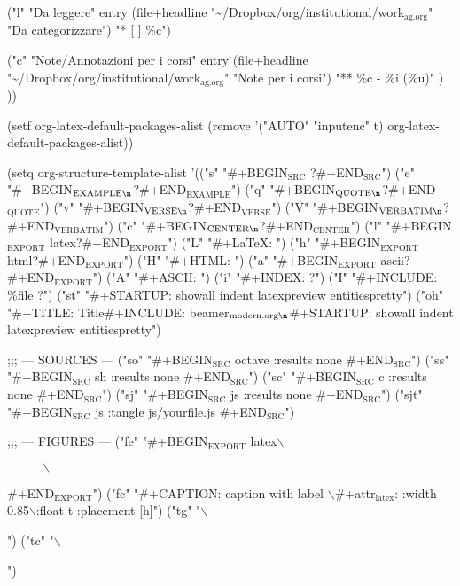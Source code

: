 \documentclass[presentation]{beamer}
\begin{document}
("l" "Da leggere" entry
 (file+headline "\textasciitilde{}/Dropbox/org/institutional/work\(_{\text{ag.org}}\)" "Da categorizzare")
 "\alert{*} [ ] \%c\n")

("c" "Note/Annotazioni per i corsi" entry
 (file+headline "\textasciitilde{}/Dropbox/org/institutional/work\(_{\text{ag.org}}\)" "Note per i corsi")
 "** \%c - \%i (\%u)"
 )
))

(setf org-latex-default-packages-alist
      (remove '("AUTO" "inputenc" t) org-latex-default-packages-alist))

(setq org-structure-template-alist
      '(("s" "\#+BEGIN\(_{\text{SRC}}\) ?\n\n\#+END\(_{\text{SRC}}\)")
        ("e" "\#+BEGIN\(_{\text{EXAMPLE}\n}\)?\n\#+END\(_{\text{EXAMPLE}}\)")
        ("q" "\#+BEGIN\(_{\text{QUOTE}\n}\)?\n\#+END\(_{\text{QUOTE}}\)")
        ("v" "\#+BEGIN\(_{\text{VERSE}\n}\)?\n\#+END\(_{\text{VERSE}}\)")
        ("V" "\#+BEGIN\(_{\text{VERBATIM}\n}\)?\n\#+END\(_{\text{VERBATIM}}\)")
        ("c" "\#+BEGIN\(_{\text{CENTER}\n}\)?\n\#+END\(_{\text{CENTER}}\)")
        ("l" "\#+BEGIN\(_{\text{EXPORT}}\) latex\n?\n\#+END\(_{\text{EXPORT}}\)")
        ("L" "\#+\LaTeX{}: ")
        ("h" "\#+BEGIN\(_{\text{EXPORT}}\) html\n?\n\#+END\(_{\text{EXPORT}}\)")
        ("H" "\#+HTML: ")
        ("a" "\#+BEGIN\(_{\text{EXPORT}}\) ascii\n?\n\#+END\(_{\text{EXPORT}}\)")
        ("A" "\#+ASCII: ")
        ("i" "\#+INDEX: ?")
        ("I" "\#+INCLUDE: \%file ?")
        ("st" "\#+STARTUP: showall indent latexpreview entitiespretty")
        ("oh" "\#+TITLE:    Title\n\#+INCLUDE: beamer\(_{\text{modern.org}\n}\)\#+STARTUP: showall indent latexpreview entitiespretty")

;;; --- SOURCES ---
     ("so"  "\#+BEGIN\(_{\text{SRC}}\) octave :results none   \n\n\#+END\(_{\text{SRC}}\)")
     ("ss"  "\#+BEGIN\(_{\text{SRC}}\) sh     :results none   \n\n\#+END\(_{\text{SRC}}\)")
     ("sc"  "\#+BEGIN\(_{\text{SRC}}\) c      :results none   \n\n\#+END\(_{\text{SRC}}\)")
     ("sj"  "\#+BEGIN\(_{\text{SRC}}\) js     :results none   \n\n\#+END\(_{\text{SRC}}\)")
     ("sjt" "\#+BEGIN\(_{\text{SRC}}\) js :tangle js/yourfile.js   \n\n\#+END\(_{\text{SRC}}\)")

;;; --- FIGURES ---
     ("fe" "\#+BEGIN\(_{\text{EXPORT}}\) latex\n$\backslash$\begin{figure}\n\n$\backslash$\end{figure}\n\#+END\(_{\text{EXPORT}}\)")
     ("fc" "\#+CAPTION: caption with label $\backslash$\label{l1}\n\#+attr\(_{\text{latex}}\): :width 0.85$\backslash$\linewidth :float t :placement [h]")
     ("tg" "$\backslash$")
     ("tc" "$\backslash$")
\end{document}
